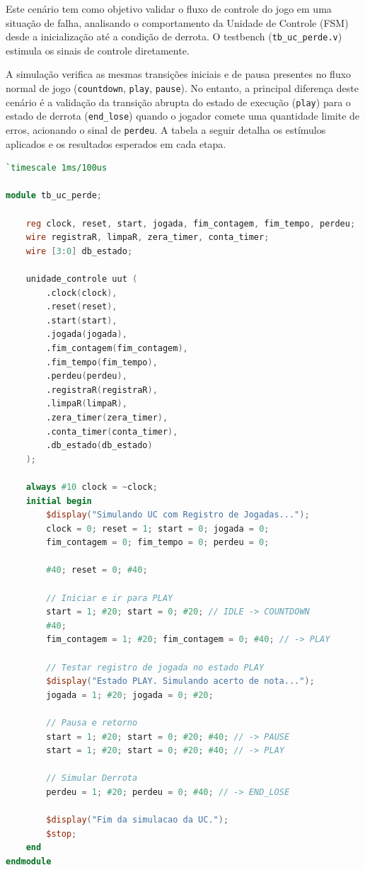 \documentclass[a4paper,12pt,twoside]{article}
\begin{document}
  Este cenário tem como objetivo validar o fluxo de controle do jogo em uma situação de falha, analisando o
  comportamento da Unidade de Controle (FSM) desde a inicialização até a condição de derrota. O testbench
  (\texttt{tb\_uc\_perde.v}) estimula os sinais de controle diretamente.


  A simulação verifica as mesmas transições iniciais e de pausa presentes no fluxo normal de jogo
  (\texttt{countdown}, \texttt{play}, \texttt{pause}). No entanto, a principal diferença deste cenário é a
  validação da transição abrupta do estado de execução (\texttt{play}) para o estado de derrota
  (\texttt{end\_lose}) quando o jogador comete uma quantidade limite de erros, acionando o sinal de
  \texttt{perdeu}. A tabela a seguir detalha os estímulos aplicados e os resultados esperados em cada etapa.

\begin{lstlisting}[language=Verilog, caption={Testbench cenário de perda}]
`timescale 1ms/100us 

module tb_uc_perde;

    reg clock, reset, start, jogada, fim_contagem, fim_tempo, perdeu;
    wire registraR, limpaR, zera_timer, conta_timer;
    wire [3:0] db_estado;

    unidade_controle uut (
        .clock(clock),
        .reset(reset),
        .start(start),
        .jogada(jogada), 
        .fim_contagem(fim_contagem),
        .fim_tempo(fim_tempo),
        .perdeu(perdeu),
        .registraR(registraR), 
        .limpaR(limpaR),     
        .zera_timer(zera_timer),
        .conta_timer(conta_timer),
        .db_estado(db_estado)
    );

    always #10 clock = ~clock;
    initial begin
        $display("Simulando UC com Registro de Jogadas...");
        clock = 0; reset = 1; start = 0; jogada = 0;
        fim_contagem = 0; fim_tempo = 0; perdeu = 0;
        
        #40; reset = 0; #40;

        // Iniciar e ir para PLAY
        start = 1; #20; start = 0; #20; // IDLE -> COUNTDOWN
        #40; 
        fim_contagem = 1; #20; fim_contagem = 0; #40; // -> PLAY

        // Testar registro de jogada no estado PLAY
        $display("Estado PLAY. Simulando acerto de nota...");
        jogada = 1; #20; jogada = 0; #20; 

        // Pausa e retorno
        start = 1; #20; start = 0; #20; #40; // -> PAUSE 
        start = 1; #20; start = 0; #20; #40; // -> PLAY 

        // Simular Derrota
        perdeu = 1; #20; perdeu = 0; #40; // -> END_LOSE 
        
        $display("Fim da simulacao da UC.");
        $stop;
    end
endmodule
\end{lstlisting}
\end{document}
